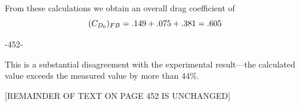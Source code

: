 From these calculations we obtain an overall drag coefficient of
\begin{equation*}
(C_{D_0})_{FB} = .149 + .075 + .381 = .605
\end{equation*}

\begin{center}
-452-
\end{center}

This is a substantial disagreement with the experimental result---the calculated value exceeds the
measured value by more than 44\%.

\begin{center}
[REMAINDER OF TEXT ON PAGE 452 IS UNCHANGED]
\end{center}
